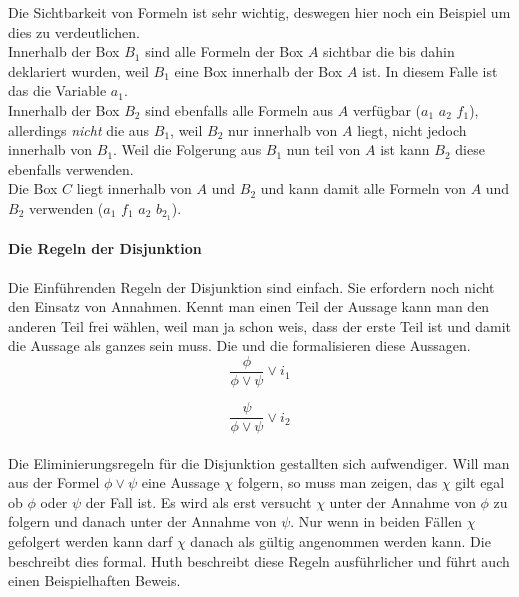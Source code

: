 Die Sichtbarkeit von Formeln ist sehr wichtig, deswegen hier noch ein Beispiel um dies zu verdeutlichen.\\
Innerhalb der Box $B_1$ sind alle Formeln der Box $A$ sichtbar die bis dahin deklariert wurden, weil $B_1$ eine Box innerhalb der Box $A$ ist. In diesem Falle ist das die Variable $a_1$.\\
Innerhalb der Box $B_2$ sind ebenfalls alle Formeln aus $A$ verfügbar ($a_1$ $a_2$ $f_1$), allerdings \emph{nicht} die aus $B_1$, weil $B_2$ nur innerhalb von $A$ liegt, nicht jedoch innerhalb von $B_1$.
Weil die Folgerung aus $B_1$ nun teil von $A$ ist kann $B_2$ diese ebenfalls verwenden.\\
Die Box $C$ liegt innerhalb von $A$ und $B_2$ und kann damit alle Formeln von $A$ und $B_2$ verwenden ($a_1$ $f_1$ $a_2$ $b_{2_1}$).\\


\paragraph{Die Regeln der Disjunktion}

Die Einführenden Regeln der Disjunktion sind einfach.
Sie erfordern noch nicht den Einsatz von Annahmen.
Kennt man einen Teil der Aussage kann man den anderen Teil frei wählen, weil man ja schon weis, dass der erste Teil \true ist und damit die Aussage als ganzes \true sein muss.
Die  und die  formalisieren diese Aussagen.\\

\begin{equation}
	\label{eq:i1Disjunction}
	\frac{\phi}{\phi \vee \psi} \vee i_1
\end{equation}

\begin{equation}
	\label{eq:i2Disjunction}
	\frac{\psi}{\phi \vee \psi} \vee i_2
\end{equation}
\\
Die Eliminierungsregeln für die Disjunktion gestallten sich aufwendiger.
Will man aus der Formel $\phi \vee \psi$ eine Aussage $\chi$ folgern, so muss man zeigen, das $\chi$ gilt egal ob $\phi$ oder $\psi$ der Fall ist. 
Es wird als erst versucht $\chi$ unter der Annahme von  $\phi$ zu folgern und danach unter der Annahme von $\psi$.
Nur wenn in beiden Fällen $\chi$ gefolgert werden kann darf $\chi$ danach als gültig angenommen werden kann.
Die  beschreibt dies formal. 
Huth \cite[S.16ff]{huth2004logic} beschreibt diese Regeln ausführlicher und führt auch einen Beispielhaften Beweis.

